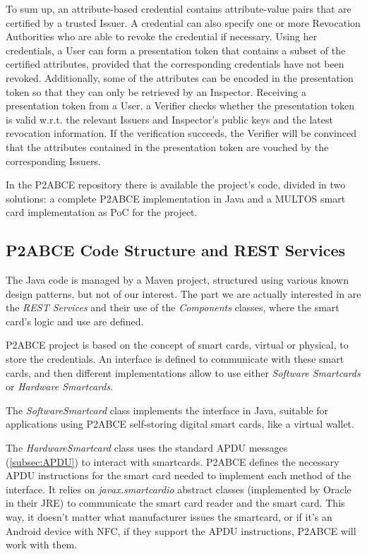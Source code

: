 To sum up, an attribute-based credential contains attribute-value pairs that are certified by a trusted Issuer. A credential can also specify one or more Revocation Authorities who are able to revoke the credential if necessary. Using her credentials, a User can form a presentation token that contains a subset of the certified attributes, provided that the corresponding credentials have not been revoked. Additionally, some of the attributes can be encoded in the presentation token so that they can only be retrieved by an Inspector. Receiving a presentation token from a User, a Verifier checks whether the presentation token is valid w.r.t. the relevant Issuers and Inspector's public keys and the latest revocation information. If the verification succeeds, the Verifier will be convinced that the attributes contained in the presentation token are vouched by the corresponding Issuers.


\hfil

In the P2ABCE repository \citep{p2abcurl} there is available the project's code, divided in two solutions: a complete P2ABCE implementation in Java and a MULTOS smart card implementation as PoC for the project.

\subsection{P2ABCE Code Structure and REST Services}

The Java code is managed by a Maven project, structured using various known design patterns, but not of our interest. The part we are actually interested in are the \textit{REST Services} and their use of the \textit{Components} classes, where the smart card's logic and use are defined.

P2ABCE project is based on the concept of smart cards, virtual or physical, to store the credentials. An interface is defined to communicate with these smart cards, and then different implementations allow to use either \textit{Software Smartcards} or \textit{Hardware Smartcards}. 

The \textit{SoftwareSmartcard} class implements the interface in Java, suitable for applications using P2ABCE self-storing digital smart cards, like a virtual wallet.

The \textit{HardwareSmartcard} class uses the standard APDU messages (\ref{subsec:APDU}) to interact with smartcards. P2ABCE defines the necessary APDU instructions for the smart card needed to implement each method of the interface. It relies on \textit{javax.smartcardio} abstract classes (implemented by Oracle in their JRE) to communicate the smart card reader and the smart card. This way, it doesn't matter what manufacturer issues the smartcard, or if it's an Android device with NFC, if they support the APDU instructions, P2ABCE will work with them.

